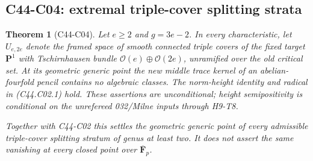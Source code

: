 \documentclass[11pt]{article}
\newtheorem{theorem}{Theorem}[section]
\theoremstyle{remark}\newtheorem{remark}[theorem]{Remark}
\begin{document}
\subsection{C44-C04: extremal triple-cover splitting strata}
\begin{theorem}[C44-C04]\label{thm:extremal-maroni}
Let $e\ge2$ and $g=3e-2$. In every characteristic, let $U_{e,2e}$
denote the framed space of smooth connected triple covers of the
fixed target $\mathbf P^1$ with Tschirnhausen bundle
$\mathcal O(e)\oplus\mathcal O(2e)$, unramified over the old
critical set. At its geometric generic point the new middle
trace kernel of an abelian-fourfold pencil contains no algebraic
classes. The norm-height identity and radical in (C44.C02.1) hold.
These assertions are unconditional; height semipositivity is
conditional on the unrefereed 032/Milne inputs through H9-T8.

Together with C44-C02 this settles the geometric generic point
of every admissible triple-cover splitting stratum of genus at
least two. It does not assert the same vanishing at every closed
point over $\overline{\mathbf F}_p$.
\end{theorem}
\end{document}
